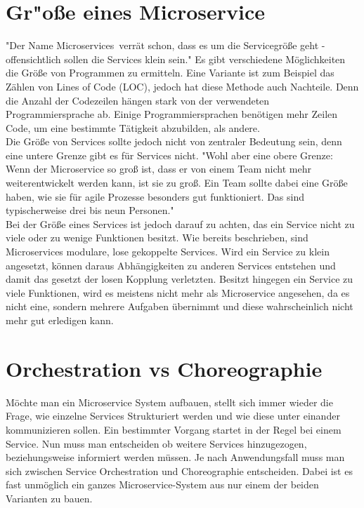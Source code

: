 \section{Gr"o\ss e eines Microservice}
\label{sec:groesseMicroservice}
"Der Name \frqq Microservices\flqq\ verrät schon, dass es um die Servicegröße geht - offensichtlich sollen die Services klein sein."\cite[S. 31]{EWolff2016:Microservices} Es gibt verschiedene Möglichkeiten die Größe von Programmen zu ermitteln. Eine Variante ist zum Beispiel das Zählen von  Lines of Code (LOC), jedoch hat diese Methode auch Nachteile. Denn die Anzahl der Codezeilen hängen stark von der verwendeten Programmiersprache ab. Einige Programmiersprachen benötigen mehr Zeilen Code, um eine bestimmte Tätigkeit abzubilden, als andere.
\\
Die Größe von Services sollte jedoch nicht von zentraler Bedeutung sein, denn eine untere Grenze gibt es für Services nicht. "Wohl aber eine obere Grenze: Wenn der Microservice so groß ist, dass er von einem Team nicht mehr weiterentwickelt werden kann, ist sie zu groß. Ein Team sollte dabei eine Größe haben, wie sie für agile Prozesse besonders gut funktioniert. Das sind typischerweise drei bis neun Personen."\cite[S. 34]{EWolff2016:Microservices}
\\
Bei der Größe eines Services ist jedoch darauf zu achten, das ein Service nicht zu viele oder zu wenige Funktionen besitzt. Wie bereits beschrieben, sind Microservices modulare, lose gekoppelte Services. Wird ein Service zu klein angesetzt, können daraus Abhängigkeiten zu anderen Services entstehen und damit das gesetzt der losen Kopplung verletzten. Besitzt hingegen ein Service zu viele Funktionen, wird es meistens nicht mehr als Microservice angesehen, da es nicht eine, sondern mehrere Aufgaben übernimmt und diese wahrscheinlich nicht mehr gut erledigen kann.

\section{Orchestration vs Choreographie}
\label{sec:orchestrationvschoreographie}
Möchte man ein Microservice System aufbauen, stellt sich immer wieder die Frage, wie einzelne Services Strukturiert werden und wie diese unter einander kommunizieren sollen. Ein bestimmter Vorgang startet in der Regel bei einem Service. Nun muss man entscheiden ob weitere Services hinzugezogen, beziehungsweise informiert werden müssen. Je nach Anwendungsfall muss man sich zwischen Service Orchestration und Choreographie entscheiden. Dabei ist es fast unmöglich ein ganzes Microservice-System aus nur einem der beiden Varianten zu bauen.

